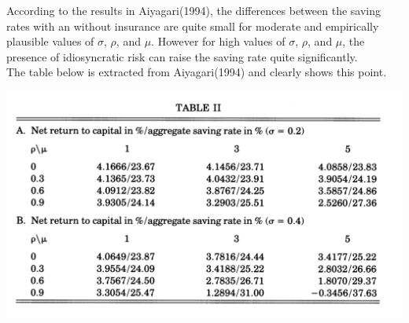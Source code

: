 \documentclass[../main.tex]{subfiles}
\title{}
\author{}
\begin{document}
\maketitle
According to the results in Aiyagari(1994), the differences between the saving rates with an without insurance are quite small for moderate and empirically plausible values of $\sigma$, $\rho$, and $\mu$. However for high values of $\sigma$, $\rho$, and $\mu$, the presence of idiosyncratic risk can raise the saving rate quite significantly. \\

The table below is extracted from Aiyagari(1994) and clearly shows this point. 

\centering
\includegraphics[scale=0.5]{../Appendix/Table-Aiyagari}
\end{document}
